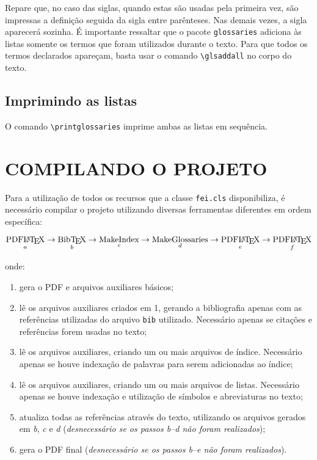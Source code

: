 \documentclass{fei}
\begin{document}
	Repare que, no caso das siglas, quando estas são usadas pela primeira vez, são impressas a definição seguida da sigla entre parênteses. Nas demais vezes, a sigla aparecerá sozinha. É importante ressaltar que o pacote \texttt{glossaries} adiciona às listas somente os termos que foram utilizados durante o texto. Para que todos os termos declarados apareçam, basta usar o comando \verb+\glsaddall+ no corpo do texto.
	
	\section{Imprimindo as listas}
	
	O comando \verb+\printglossaries+ imprime ambas as listas em sequência.

	\chapter{COMPILANDO O PROJETO} \label{chap:compilando}
	
	Para a utilização de todos os recursos que a classe \verb+fei.cls+ disponibiliza, é necessário compilar o projeto utilizando diversas ferramentas diferentes em ordem específica:
	
	\[\operatorname*{\text{PDF\LaTeX}}_a \to \operatorname*{\text{Bib\TeX}}_b \to \operatorname*{\text{MakeIndex}}_c \to \operatorname*{\text{MakeGlossaries}}_d \to \operatorname*{\text{PDF\LaTeX}}_e \to \operatorname*{\text{PDF\LaTeX}}_f\]
	
	onde:
	
	\begin{enumerate}
	\item gera o PDF e arquivos auxiliares básicos;
	\item lê os arquivos auxiliares criados em 1, gerando a bibliografia apenas com as referências utilizadas do arquivo \texttt{bib} utilizado. Necessário apenas se citações e referências forem usadas no texto;
	\item lê os arquivos auxiliares, criando um ou mais arquivos de índice. Necessário apenas se houve indexação de palavras para serem adicionadas ao índice;
	\item lê os arquivos auxiliares, criando um ou mais arquivos de listas. Necessário apenas se houve indexação e utilização de símbolos e abreviaturas no texto;
	\item atualiza todas as referências através do texto, utilizando os arquivos gerados em \emph{b}, \emph{c} e \emph{d} (\emph{desnecessário se os passos b--d não foram realizados});
	\item gera o PDF final (\emph{desnecessário se os passos b--e não foram realizados}).
	\end{enumerate}
	
\end{document}
